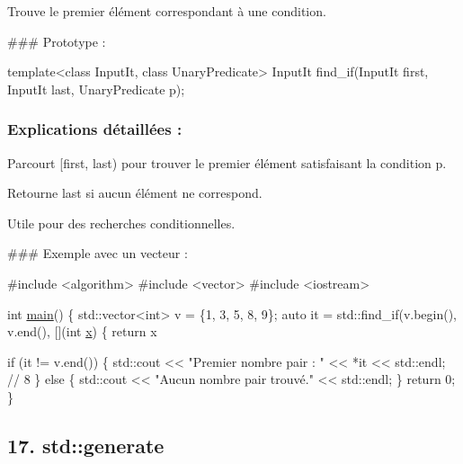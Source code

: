 Trouve le premier élément correspondant à une condition.

\#\#\# Prototype \+: 
\begin{DoxyCode}
\textcolor{keyword}{template}<\textcolor{keyword}{class} InputIt, \textcolor{keyword}{class} UnaryPredicate>
InputIt find\_if(InputIt first, InputIt last, UnaryPredicate p);
\end{DoxyCode}


\subsubsection*{Explications détaillées \+:}


\begin{DoxyItemize}
\item Parcourt {\ttfamily \mbox{[}first, last)} pour trouver le premier élément satisfaisant la condition {\ttfamily p}.
\item Retourne {\ttfamily last} si aucun élément ne correspond.
\item Utile pour des recherches conditionnelles.
\end{DoxyItemize}

\#\#\# Exemple avec un vecteur \+: 
\begin{DoxyCode}
\textcolor{preprocessor}{#include <algorithm>}
\textcolor{preprocessor}{#include <vector>}
\textcolor{preprocessor}{#include <iostream>}

\textcolor{keywordtype}{int} \hyperlink{htop_8c_a3c04138a5bfe5d72780bb7e82a18e627}{main}() \{
    std::vector<int> v = \{1, 3, 5, 8, 9\};
    \textcolor{keyword}{auto} it = std::find\_if(v.begin(), v.end(), [](\textcolor{keywordtype}{int} \hyperlink{addition_8c_a6150e0515f7202e2fb518f7206ed97dc}{x}) \{ \textcolor{keywordflow}{return} x %

    \textcolor{keywordflow}{if} (it != v.end()) \{
        std::cout << \textcolor{stringliteral}{"Premier nombre pair : "} << *it << std::endl; \textcolor{comment}{// 8}
    \} \textcolor{keywordflow}{else} \{
        std::cout << \textcolor{stringliteral}{"Aucun nombre pair trouvé."} << std::endl;
    \}
    \textcolor{keywordflow}{return} 0;
\}
\end{DoxyCode}
 



\subsection*{17. {\bfseries std\+::generate}}

